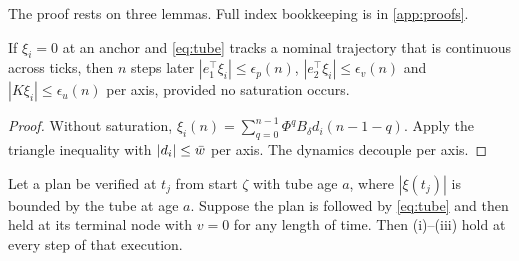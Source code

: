 The proof rests on three lemmas. Full index bookkeeping is in
\cref{app:proofs}.

\begin{lemma}[Tube]\label{lem:tube}
If $\xi_i=0$ at an anchor and \eqref{eq:tube} tracks a nominal trajectory that
is continuous across ticks, then $n$ steps later
$|e_1^\top\xi_i|\le\epsilon_p(n)$, $|e_2^\top\xi_i|\le\epsilon_v(n)$ and
$|K\xi_i|\le\epsilon_u(n)$ per axis, provided no saturation occurs.
\end{lemma}
\begin{proof}
Without saturation, $\xi_i(n)=\sum_{q=0}^{n-1}\Phi^qB_\delta d_i(n{-}1{-}q)$.
Apply the triangle inequality with $|d_i|\le\bar w$ per axis. The dynamics
decouple per axis.
\end{proof}

\begin{lemma}\label{lem:certplan}
Let a plan be verified at $t_j$ from start $\zeta$ with tube age $a$, where
$|\xi(t_j)|$ is bounded by the tube at age $a$. Suppose the plan is followed
by \eqref{eq:tube} and then held at its terminal node with $v=0$ for any
length of time. Then (i)--(iii) hold at every step of that execution.
\end{lemma}
